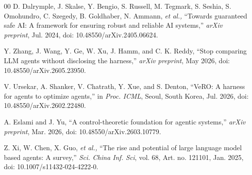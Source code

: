 \documentclass[journal,twoside,web]{ieeecolor_no_firstpage_logo}
\begin{document}
\begin{thebibliography}{00}
 D. Dalrymple, J. Skalse, Y. Bengio, S. Russell, M. Tegmark, S. Seshia, S. Omohundro, C. Szegedy, B. Goldhaber, N. Ammann, \textit{et al.,} “Towards guaranteed safe AI: A framework for ensuring robust and reliable AI systems,” \textit{arXiv preprint}, Jul. 2024, doi: 10.48550/arXiv.2405.06624.

 Y. Zhang, J. Wang, Y. Ge, W. Xu, J. Hamm, and C. K. Reddy, “Stop comparing LLM agents without disclosing the harness,” \textit{arXiv preprint}, May 2026, doi: 10.48550/arXiv.2605.23950.

 V. Ursekar, A. Shanker, V. Chatrath, Y. Xue, and S. Denton, “VeRO: A harness for agents to optimize agents,” in \textit{Proc. ICML}, Seoul, South Korea, Jul. 2026, doi: 10.48550/arXiv.2602.22480.

 A. Eslami and J. Yu, “A control-theoretic foundation for agentic systems,” \textit{arXiv preprint}, Mar. 2026, doi: 10.48550/arXiv.2603.10779.

 Z. Xi, W. Chen, X. Guo, \textit{et al.,} “The rise and potential of large language model based agents: A survey,” \textit{Sci. China Inf. Sci}, vol. 68, Art. no. 121101, Jan. 2025, doi: 10.1007/s11432-024-4222-0.
\end{thebibliography}


\end{document}

